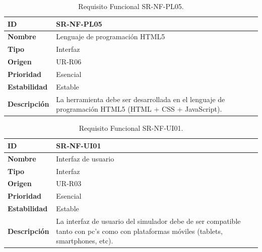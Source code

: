 \begin{center}
\begin{table}[htbp]
\centering
\begin{tabular}{@{}p{2.5cm} p{9cm}@{}} 
\toprule
\textbf{ID} 				& SR-NF-PL05 \\
\midrule
\textbf{Nombre} 			& Lenguaje de programación HTML5 \\
\midrule
\textbf{Tipo} 			& Interfaz \\
\midrule
\textbf{Origen} 			& UR-R06 \\
\midrule
\textbf{Prioridad}		& Esencial \\
\midrule
\textbf{Estabilidad} 		& Estable \\
\midrule
\textbf{Descripción} 	& La herramienta debe ser desarrollada en el lenguaje de programación HTML5 (HTML + CSS + JavaScript). \\
\bottomrule
\end{tabular}
\caption{Requisito Funcional SR-NF-PL05.}
\label{tab:srnfpl05}
\end{table}
\end{center}

\begin{center}
\begin{table}[htbp]
\centering
\begin{tabular}{@{}p{2.5cm} p{9cm}@{}} 
\toprule
\textbf{ID} 				& SR-NF-UI01 \\
\midrule
\textbf{Nombre} 			& Interfaz de usuario \\
\midrule
\textbf{Tipo} 			& Interfaz \\
\midrule
\textbf{Origen} 			& UR-R03 \\
\midrule
\textbf{Prioridad}		& Esencial \\
\midrule
\textbf{Estabilidad} 		& Estable \\
\midrule
\textbf{Descripción} 	& La interfaz de usuario del simulador debe de ser compatible tanto con pc's como con plataformas móviles (tablets, smartphones, etc). \\
\bottomrule
\end{tabular}
\caption{Requisito Funcional SR-NF-UI01.}
\label{tab:srnfui01}
\end{table}
\end{center}

